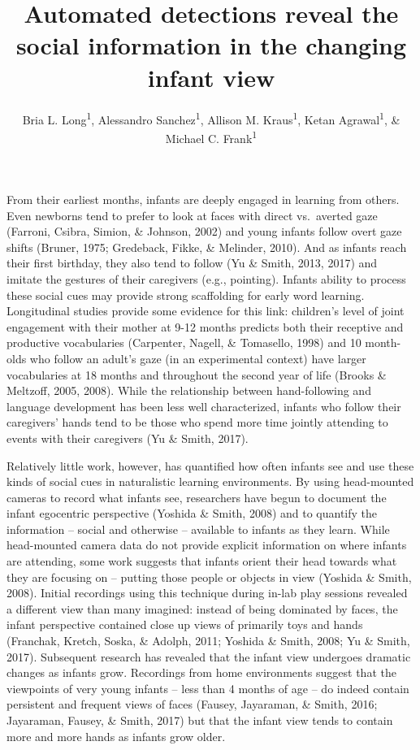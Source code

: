 \documentclass[english,man]{apa6}
\author{Bria L. Long\textsuperscript{1}, Alessandro Sanchez\textsuperscript{1}, Allison M. Kraus\textsuperscript{1}, Ketan Agrawal\textsuperscript{1}, \& Michael C. Frank\textsuperscript{1}}
\affiliation{
\vspace{0.5cm}
\textsuperscript{1} Department of Psychology, Stanford University}
\title{Automated detections reveal the social information in the changing
infant view}
\date{}
\begin{document}
\maketitle

From their earliest months, infants are deeply engaged in learning from
others. Even newborns tend to prefer to look at faces with direct
vs.~averted gaze (Farroni, Csibra, Simion, \& Johnson, 2002) and young
infants follow overt gaze shifts (Bruner, 1975; Gredeback, Fikke, \&
Melinder, 2010). And as infants reach their first birthday, they also
tend to follow (Yu \& Smith, 2013, 2017) and imitate the gestures of
their caregivers (e.g., pointing). Infants ability to process these
social cues may provide strong scaffolding for early word learning.
Longitudinal studies provide some evidence for this link: children's
level of joint engagement with their mother at 9-12 months predicts both
their receptive and productive vocabularies (Carpenter, Nagell, \&
Tomasello, 1998) and 10 month-olds who follow an adult's gaze (in an
experimental context) have larger vocabularies at 18 months and
throughout the second year of life (Brooks \& Meltzoff, 2005, 2008).
While the relationship between hand-following and language development
has been less well characterized, infants who follow their caregivers'
hands tend to be those who spend more time jointly attending to events
with their caregivers (Yu \& Smith, 2017).

Relatively little work, however, has quantified how often infants see
and use these kinds of social cues in naturalistic learning
environments. By using head-mounted cameras to record what infants see,
researchers have begun to document the infant egocentric perspective
(Yoshida \& Smith, 2008) and to quantify the information -- social and
otherwise -- available to infants as they learn. While head-mounted
camera data do not provide explicit information on where infants are
attending, some work suggests that infants orient their head towards
what they are focusing on -- putting those people or objects in view
(Yoshida \& Smith, 2008). Initial recordings using this technique during
in-lab play sessions revealed a different view than many imagined:
instead of being dominated by faces, the infant perspective contained
close up views of primarily toys and hands (Franchak, Kretch, Soska, \&
Adolph, 2011; Yoshida \& Smith, 2008; Yu \& Smith, 2017). Subsequent
research has revealed that the infant view undergoes dramatic changes as
infants grow. Recordings from home environments suggest that the
viewpoints of very young infants -- less than 4 months of age -- do
indeed contain persistent and frequent views of faces (Fausey,
Jayaraman, \& Smith, 2016; Jayaraman, Fausey, \& Smith, 2017) but that
the infant view tends to contain more and more hands as infants grow
older.
\end{document}
